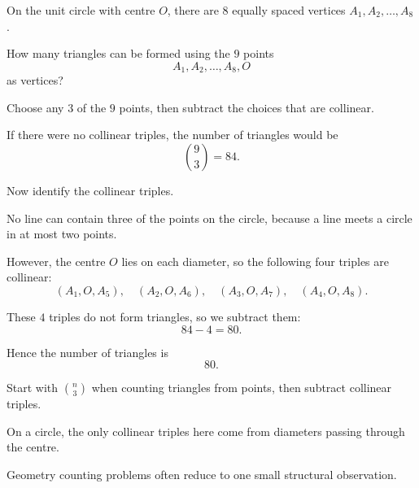 \begin{problem}
On the unit circle with centre $O$, there are $8$ equally spaced vertices $A_1,A_2,\dots,A_8$.

How many triangles can be formed using the $9$ points
\[
A_1,A_2,\dots,A_8,O
\]
as vertices?

\begin{center}
\end{center}
\end{problem}

\begin{hint}
Choose any $3$ of the $9$ points, then subtract the choices that are collinear.
\end{hint}

\begin{solution}
If there were no collinear triples, the number of triangles would be
\[
\binom{9}{3}=84.
\]

Now identify the collinear triples.

No line can contain three of the points on the circle, because a line meets a circle in at most two points.

However, the centre $O$ lies on each diameter, so the following four triples are collinear:
\[
(A_1,O,A_5),\quad (A_2,O,A_6),\quad (A_3,O,A_7),\quad (A_4,O,A_8).
\]

These $4$ triples do not form triangles, so we subtract them:
\[
84-4=80.
\]

Hence the number of triangles is
\[
\boxed{80}.
\]
\end{solution}

\begin{takeaways}
\item Start with $\binom{n}{3}$ when counting triangles from points, then subtract collinear triples.
\item On a circle, the only collinear triples here come from diameters passing through the centre.
\item Geometry counting problems often reduce to one small structural observation.
\end{takeaways}

